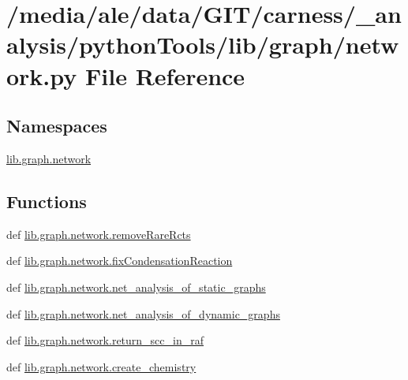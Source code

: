 \hypertarget{a00053}{\section{/media/ale/data/\-G\-I\-T/carness/\-\_\-analysis/python\-Tools/lib/graph/network.py File Reference}
\label{a00053}
}
\subsection*{Namespaces}
\begin{DoxyCompactItemize}
\item 
\hyperlink{a00109}{lib.\-graph.\-network}
\end{DoxyCompactItemize}
\subsection*{Functions}
\begin{DoxyCompactItemize}
\item 
def \hyperlink{a00109_aa023644e6dad3ed7be55a592d8576007}{lib.\-graph.\-network.\-remove\-Rare\-Rcts}
\item 
def \hyperlink{a00109_a31099e87728bb8b899360bb641bb6b64}{lib.\-graph.\-network.\-fix\-Condensation\-Reaction}
\item 
def \hyperlink{a00109_a47be50a907814919f86f8313927d3236}{lib.\-graph.\-network.\-net\-\_\-analysis\-\_\-of\-\_\-static\-\_\-graphs}
\item 
def \hyperlink{a00109_ab2528d394362bfca89834b72d8024e6f}{lib.\-graph.\-network.\-net\-\_\-analysis\-\_\-of\-\_\-dynamic\-\_\-graphs}
\item 
def \hyperlink{a00109_a5c4fdcb64dea8b366645ad27dc71bff8}{lib.\-graph.\-network.\-return\-\_\-scc\-\_\-in\-\_\-raf}
\item 
def \hyperlink{a00109_a22ad63e3d10c613dc181b9e69ad1cef5}{lib.\-graph.\-network.\-create\-\_\-chemistry}
\end{DoxyCompactItemize}
